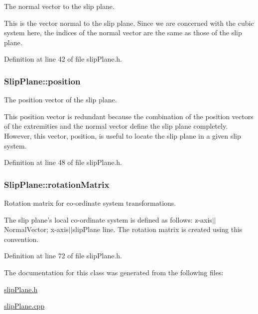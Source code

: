 \-The normal vector to the slip plane. 

\-This is the vector normal to the slip plane. \-Since we are concerned with the cubic system here, the indices of the normal vector are the same as those of the slip plane. 

\-Definition at line 42 of file slip\-Plane.\-h.

\hypertarget{classSlipPlane_ac2ac59e22e9638a990c9e45aaa096d9a}{
\subsubsection[{position}]{ {\bf \-Slip\-Plane\-::position}}}\label{db/d25/classSlipPlane_ac2ac59e22e9638a990c9e45aaa096d9a}


\-The position vector of the slip plane. 

\-This position vector is redundant because the combination of the position vectors of the extremities and the normal vector define the slip plane completely. \-However, this vector, position, is useful to locate the slip plane in a given slip system. 

\-Definition at line 48 of file slip\-Plane.\-h.

\hypertarget{classSlipPlane_a1aa5aacccb6bb03d163a95251aa10d6c}{
\subsubsection[{rotation\-Matrix}]{ {\bf \-Slip\-Plane\-::rotation\-Matrix}}}\label{db/d25/classSlipPlane_a1aa5aacccb6bb03d163a95251aa10d6c}


\-Rotation matrix for co-\/ordinate system transformations. 

\-The slip plane's local co-\/ordinate system is defined as follows\-: z-\/axis$|$$|$\-Normal\-Vector; x-\/axis$|$$|$slip\-Plane line. \-The rotation matrix is created using this convention. 

\-Definition at line 72 of file slip\-Plane.\-h.



\-The documentation for this class was generated from the following files\-:\begin{DoxyCompactItemize}
\item 
\hyperlink{slipPlane_8h}{slip\-Plane.\-h}\item 
\hyperlink{slipPlane_8cpp}{slip\-Plane.\-cpp}\end{DoxyCompactItemize}
